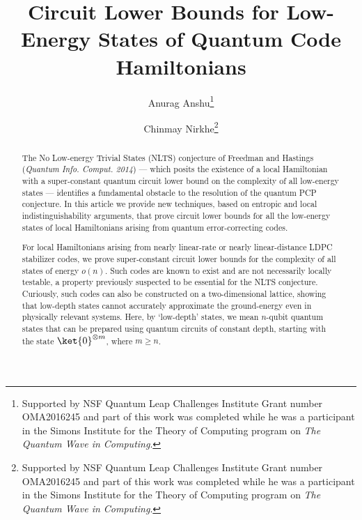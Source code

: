 \documentclass{toc}
\begin{document}
\begin{frontmatter}%

%
%
%

%
%

%
%

\title{Circuit Lower Bounds for Low-Energy States of
Quantum Code Hamiltonians}
%
%
%
%

%
%
%
%
%
%
%
%
%
%
%
%


%
%
%
%

%

\author[Anshu]{Anurag Anshu\thanks{Supported by NSF Quantum Leap Challenges Institute Grant number
OMA2016245 and part of this work was completed while he was a participant in the Simons Institute for the Theory of Computing program on \emph{The Quantum Wave in Computing}.}}
\author[Nirkhe]{Chinmay Nirkhe\thanks{Supported by NSF Quantum Leap Challenges Institute Grant number
OMA2016245 and part of this work was completed while he was a participant in the Simons Institute for the Theory of Computing program on \emph{The Quantum Wave in Computing}.}}

%
%
%
%

%
%
%
%
%
%
%
%
\begin{abstract}
  The No Low-energy Trivial States (NLTS) conjecture of Freedman and Hastings (\textit{Quantum
Info. Comput. 2014}) --- which posits the existence of a local Hamiltonian with a super-constant quantum circuit lower bound on the complexity of all low-energy states --- identifies a fundamental obstacle to the resolution of the quantum PCP conjecture.
In this %
%
article   %
we provide new techniques, based on entropic and local indistinguishability arguments, that prove circuit lower bounds for all the low-energy states of local Hamiltonians arising from quantum error-correcting codes.

For local Hamiltonians arising from nearly linear-rate or nearly linear-distance LDPC stabilizer codes, we prove super-constant circuit lower bounds for the complexity of all states of energy $o(n)$. Such codes are known to exist and are not necessarily
%
locally testable,    %
a property previously suspected to be essential for the NLTS conjecture. Curiously, such codes can
also be constructed on a two-dimensional lattice, showing that low-depth states %
%
%
cannot accurately approximate the ground-energy even in physically relevant systems.
%
%
%
Here, by `low-depth' states, we mean $n$-qubit quantum states that can be prepared using 
quantum circuits of constant depth, starting with the state $\ket{0}^{\otimes m}$,
where $m \geq n$.   %

\end{abstract}

%

\end{frontmatter}
\end{document}
